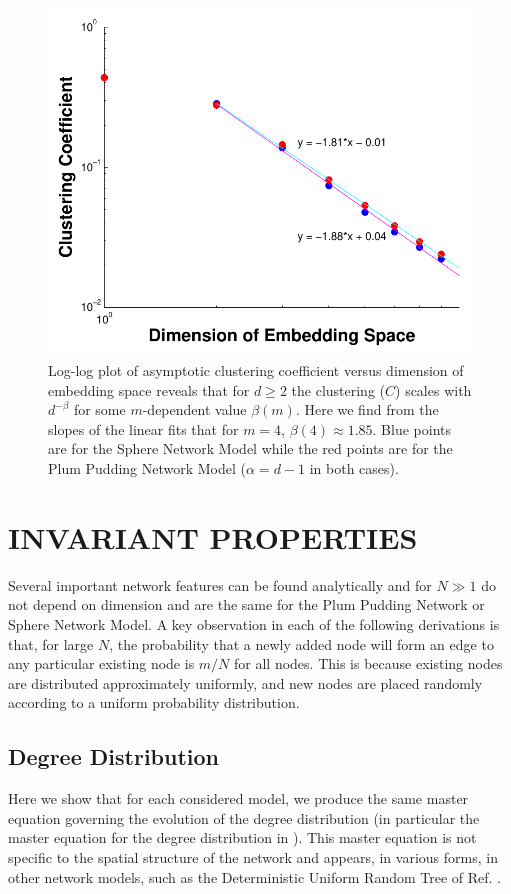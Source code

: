 \documentclass[aps,pre,reprint,superscriptaddress,amsmath,amssymb,nofootinbib]{revtex4-1}
\begin{document}
\begin{figure}
\includegraphics[width=\linewidth]{figures/figCvsD.pdf}
\caption{\label{clustdim}Log-log plot of asymptotic clustering coefficient versus dimension of embedding space reveals that for $d \geq 2$ the clustering ($C$) scales with $d^{-\beta}$ for some $m$-dependent value $\beta(m)$. Here we find from the slopes of the linear fits that for $m=4$, $\beta(4) \approx 1.85$. Blue points are for the Sphere Network Model while the red points are for the Plum Pudding Network Model ($\alpha = d-1$ in both cases).}
\end{figure}

\section{INVARIANT PROPERTIES}
Several important network features can be found analytically and for $N \gg 1$ do not depend on dimension and are the same for the Plum Pudding Network or Sphere Network Model.
A key observation in each of the following derivations is that, for large $N$, the probability that a newly added node will form an edge to any particular existing node is $m/N$ for all nodes.
This is because existing nodes are distributed approximately uniformly, and new nodes are placed randomly according to a uniform probability distribution.

\subsection{Degree Distribution}
\label{sub:degreedistribution}
Here we show that for each considered model, we produce the same master equation governing the evolution of the degree distribution (in particular the master equation for the degree distribution in \cite{ozik2004}).  
This master equation is not specific to the spatial structure of the network and appears, in various forms, in other network models, such as the Deterministic Uniform Random Tree of Ref. \cite{zhang2008topologies}.
\end{document}
